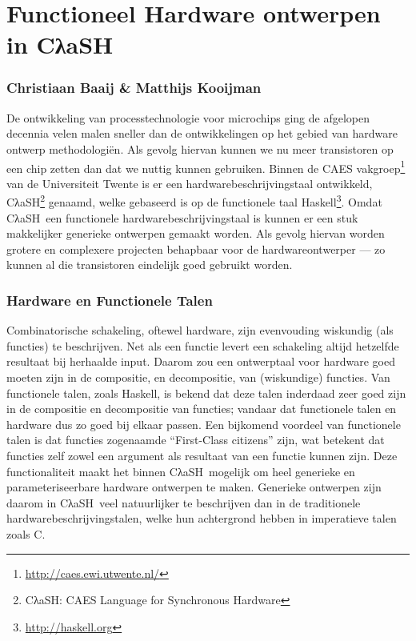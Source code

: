\documentclass{paper}
\newcommand{\clash}{CλaSH}
\begin{document}
\pagestyle{empty}
\section*{Functioneel Hardware ontwerpen in \clash}
\subsubsection*{Christiaan Baaij \& Matthijs Kooijman}

De ontwikkeling van processtechnologie voor microchips ging de afgelopen decennia velen malen sneller dan de ontwikkelingen op het gebied van hardware ontwerp methodologi\"{e}n.
Als gevolg hiervan kunnen we nu meer transistoren op een chip zetten dan dat we nuttig kunnen gebruiken.
Binnen de CAES vakgroep\footnote{\url{http://caes.ewi.utwente.nl/}} van de Universiteit Twente is er een hardwarebeschrijvingstaal ontwikkeld, \clash\footnote{\clash: CAES Language for Synchronous Hardware} genaamd, welke gebaseerd is op de functionele taal Haskell\footnote{\url{http://haskell.org}}.
Omdat \clash\ een functionele hardwarebeschrijvingstaal is kunnen er een stuk makkelijker generieke ontwerpen gemaakt worden.
Als gevolg hiervan worden grotere en complexere projecten behapbaar voor de hardwareontwerper --- zo kunnen al die transistoren eindelijk goed gebruikt worden.

\subsubsection*{Hardware en Functionele Talen}
Combinatorische schakeling, oftewel hardware, zijn evenvouding wiskundig (als functies) te beschrijven.
Net als een functie levert een schakeling altijd hetzelfde resultaat bij herhaalde input.
Daarom zou een ontwerptaal voor hardware goed moeten zijn in de compositie, en decompositie, van (wiskundige) functies.
Van functionele talen, zoals Haskell, is bekend dat deze talen inderdaad zeer goed zijn in de compositie en decompositie van functies; vandaar dat functionele talen en hardware dus zo goed bij elkaar passen.
Een bijkomend voordeel van functionele talen is dat functies zogenaamde ``First-Class citizens'' zijn, wat betekent dat functies zelf zowel een argument als resultaat van een functie kunnen zijn.
Deze functionaliteit maakt het binnen \clash\ mogelijk om heel generieke en parameteriseerbare hardware ontwerpen te maken.
Generieke ontwerpen zijn daarom in \clash\ veel natuurlijker te beschrijven dan in de traditionele hardwarebeschrijvingstalen, welke hun achtergrond hebben in imperatieve talen zoals C.
\end{document}

